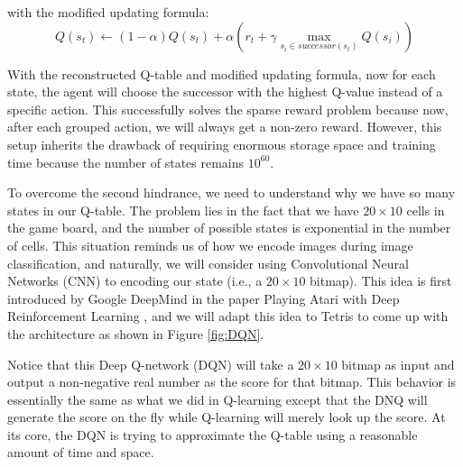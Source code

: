 \documentclass[letterpaper]{article} %
\begin{document}
with the modified updating formula:
\[
    Q(s_{t}) \leftarrow (1-\alpha) Q(s_{t}) + \alpha   \left ( r_{t} + \gamma  \max_{s_{i} \in successor(s_{t})}Q(s_{i})\right ) 
\]

With the reconstructed Q-table and modified updating formula, now for each state, the agent will choose the successor with the highest Q-value instead of a specific action. This successfully solves the sparse reward problem because now, after each grouped action, we will always get a non-zero reward. However, this setup inherits the drawback of requiring enormous storage space and training time because the number of states remains $10^{60}$. 

To overcome the second hindrance, we need to understand why we have so many states in our Q-table. The problem lies in the fact that we have $20\times 10$ cells in the game board, and the number of possible states is exponential in the number of cells. This situation reminds us of how we encode images during image classification, and naturally, we will consider using Convolutional Neural Networks (CNN) to encoding our state (i.e., a $20\times 10$ bitmap).  This idea is first introduced by Google DeepMind in the paper Playing Atari with Deep Reinforcement Learning \cite{Mnih_2013}, and we will adapt this idea to Tetris to come up with the architecture as shown in Figure \ref{fig:DQN}.



Notice that this Deep Q-network (DQN) will take a $20\times 10$ bitmap as input and output a non-negative real number as the score for that bitmap. This behavior is essentially the same as what we did in Q-learning except that the DNQ will generate the score on the fly while Q-learning will merely look up the score. At its core, the DQN is trying to approximate the Q-table using a reasonable amount of time and space. 
\end{document}
